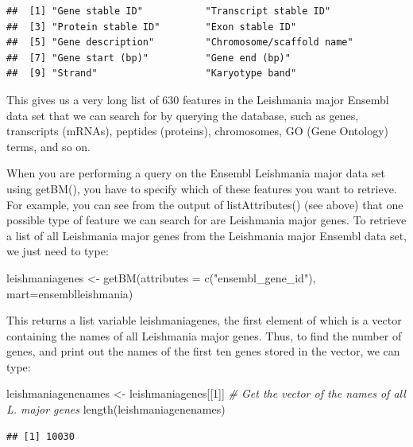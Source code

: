 \documentclass[
]{book}
\newenvironment{Shaded}{\begin{snugshade}}{\end{snugshade}}
\newcommand{\AttributeTok}[1]{\textcolor[rgb]{0.77,0.63,0.00}{#1}}
\newcommand{\CommentTok}[1]{\textcolor[rgb]{0.56,0.35,0.01}{\textit{#1}}}
\newcommand{\DecValTok}[1]{\textcolor[rgb]{0.00,0.00,0.81}{#1}}
\newcommand{\FunctionTok}[1]{\textcolor[rgb]{0.00,0.00,0.00}{#1}}
\newcommand{\NormalTok}[1]{#1}
\newcommand{\OtherTok}[1]{\textcolor[rgb]{0.56,0.35,0.01}{#1}}
\newcommand{\StringTok}[1]{\textcolor[rgb]{0.31,0.60,0.02}{#1}}
\begin{document}
\begin{verbatim}
##  [1] "Gene stable ID"           "Transcript stable ID"    
##  [3] "Protein stable ID"        "Exon stable ID"          
##  [5] "Gene description"         "Chromosome/scaffold name"
##  [7] "Gene start (bp)"          "Gene end (bp)"           
##  [9] "Strand"                   "Karyotype band"
\end{verbatim}

This gives us a very long list of 630 features in the Leishmania major Ensembl data set that we can search for by querying the database, such as genes, transcripts (mRNAs), peptides (proteins), chromosomes, GO (Gene Ontology) terms, and so on.

When you are performing a query on the Ensembl Leishmania major data set using getBM(), you have to specify which of these features you want to retrieve. For example, you can see from the output of listAttributes() (see above) that one possible type of feature we can search for are Leishmania major genes. To retrieve a list of all Leishmania major genes from the Leishmania major Ensembl data set, we just need to type:

\begin{Shaded}
\begin{Highlighting}[]
\NormalTok{leishmaniagenes }\OtherTok{\textless{}{-}} \FunctionTok{getBM}\NormalTok{(}\AttributeTok{attributes =} \FunctionTok{c}\NormalTok{(}\StringTok{"ensembl\_gene\_id"}\NormalTok{), }\AttributeTok{mart=}\NormalTok{ensemblleishmania)}
\end{Highlighting}
\end{Shaded}

This returns a list variable leishmaniagenes, the first element of which is a vector containing the names of all Leishmania major genes. Thus, to find the number of genes, and print out the names of the first ten genes stored in the vector, we can type:

\begin{Shaded}
\begin{Highlighting}[]
\NormalTok{leishmaniagenenames }\OtherTok{\textless{}{-}}\NormalTok{ leishmaniagenes[[}\DecValTok{1}\NormalTok{]] }\CommentTok{\# Get the vector of the names of all L. major genes}
\FunctionTok{length}\NormalTok{(leishmaniagenenames)}
\end{Highlighting}
\end{Shaded}

\begin{verbatim}
## [1] 10030
\end{verbatim}
\end{document}
